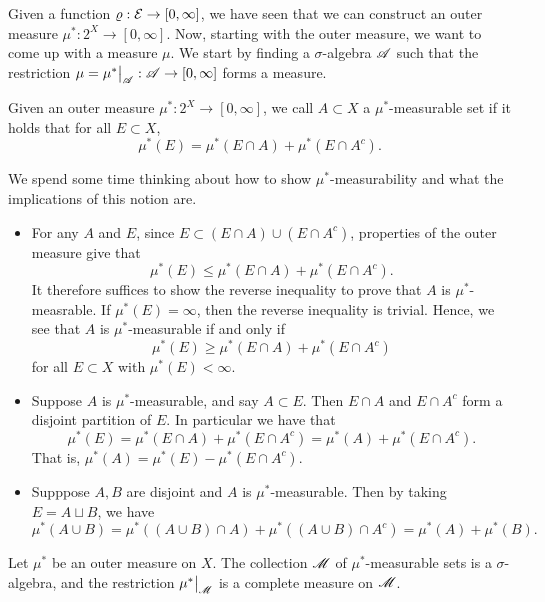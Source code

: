 \documentclass[12pt]{article} %
\begin{document}
Given a function $\varrho: \mathcal{E} \to [0,\infty]$, we have seen that we can construct an outer measure $\mu^* : 2^X \to [0,\infty]$. Now, starting with the outer measure, we want to come up with a measure $\mu$. We start by finding a $\sigma$-algebra $\mathscr{A}$ such that the restriction $\mu = \restr{\mu^*}{\SA} : \SA \to [0,\infty]$ forms a measure.

\begin{definition}[$\mu^*$-measurability]
    Given an outer measure $\mu^* : 2^X \to [0,\infty]$, we call $A \subset X$ a $\mu^*$-measurable set if it holds that for all $E \subset X$, \[\mu^*(E) = \mu^*(E \cap A) + \mu^*(E \cap A^c).\]
\end{definition}

\begin{remark}
    We spend some time thinking about how to show $\mu^*$-measurability and what the implications of this notion are.
    \begin{itemize}
        \item For any $A$ and $E$, since $E \subset (E \cap A) \cup (E \cap A^c)$, properties of the outer measure give that \[\mu^*(E) \leq \mu^*(E \cap A) + \mu^*(E \cap A^c).\] It therefore suffices to show the reverse inequality to prove that $A$ is $\mu^*$-measrable. If $\mu^*(E) = \infty$, then the reverse inequality is trivial. Hence, we see that $A$ is $\mu^*$-measurable if and only if \[\mu^*(E) \geq \mu^*(E \cap A) + \mu^*(E \cap A^c)\] for all $E \subset X$ with $\mu^*(E) < \infty$.
        \item Suppose $A$ is $\mu^*$-measurable, and say $A \subset E$. Then $E \cap A$ and $E \cap A^c$ form a disjoint partition of $E$. In particular we have that \[\mu^*(E) = \mu^*(E \cap A) + \mu^*(E \cap A^c) = \mu^*(A) + \mu^*(E \cap A^c).\] That is, $\mu^*(A) = \mu^*(E) - \mu^*(E  \cap A^c)$. 
        \item Supppose $A, B$ are disjoint and $A$ is $\mu^*$-measurable. Then by taking $E = A \sqcup B$, we have \[\mu^*(A \cup B) = \mu^*((A \cup B) \cap A) + \mu^*((A \cup B) \cap A^c) = \mu^*(A) + \mu^*(B).\]
    \end{itemize}
\end{remark}

\begin{theorem}[Caratheodory]
    Let $\mu^*$ be an outer measure on $X$. The collection $\mathscr{M}$ of $\mu^*$-measurable sets is a $\sigma$-algebra, and the restriction $\restr{\mu^*}{\SM}$ is a complete measure on $\mathscr{M}$.
\end{theorem}
\end{document}
